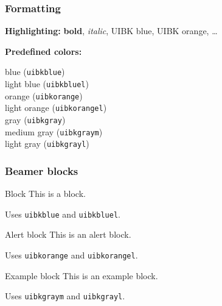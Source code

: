 \documentclass[11pt,t,usepdftitle=false,aspectratio=169]{beamer}
\begin{document}
\begin{frame}[fragile]
\frametitle{Formatting}

   \textbf{Highlighting:} \textbf{bold}, \textit{italic}, {\color{uibkblue} UIBK blue}, {\color{uibkorange} UIBK orange}, \dots

   \bigskip

   \textbf{Predefined colors:}

   \smallskip

    \quad blue (\verb|uibkblue|) \\[1mm]
    \quad light blue (\verb|uibkbluel|) \\[1mm]
    \quad orange (\verb|uibkorange|) \\[1mm]
    \quad light orange (\verb|uibkorangel|) \\[1mm]
    \quad gray (\verb|uibkgray|) \\[1mm]
    \quad medium gray (\verb|uibkgraym|) \\[1mm]
    \quad light gray (\verb|uibkgrayl|)

\end{frame}


\begin{frame}[fragile]
\frametitle{Beamer blocks}

   \begin{block}{Block}
      This is a block.

      Uses \verb|uibkblue| and \verb|uibkbluel|.
   \end{block}

\medskip

   \begin{alertblock}{Alert block}
      This is an alert block.

      Uses \verb|uibkorange| and \verb|uibkorangel|.
   \end{alertblock}

\medskip

   \begin{exampleblock}{Example block}
      This is an example block.

      Uses \verb|uibkgraym| and \verb|uibkgrayl|.
   \end{exampleblock}

\end{frame}
\end{document}

